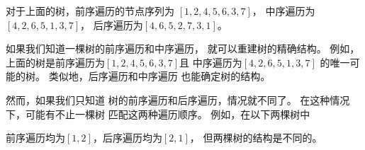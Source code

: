 对于上面的树，前序遍历的节点序列为
$[1,2,4,5,6,3,7]$，
中序遍历为$[4,2,6,5,1,3,7]$，
后序遍历为$[4,6,5,2,7,3,1]$。

如果我们知道一棵树的前序遍历和中序遍历，
就可以重建树的精确结构。
例如，上面的树是前序遍历为$[1,2,4,5,6,3,7]$且
中序遍历为$[4,2,6,5,1,3,7]$
的唯一可能的树。
类似地，后序遍历和中序遍历
也能确定树的结构。

然而，如果我们只知道
树的前序遍历和后序遍历，情况就不同了。
在这种情况下，可能有不止一棵树
匹配这两种遍历顺序。
例如，在以下两棵树中
\begin{center}
\end{center}
前序遍历均为$[1,2]$，后序遍历均为$[2,1]$，
但两棵树的结构是不同的。

